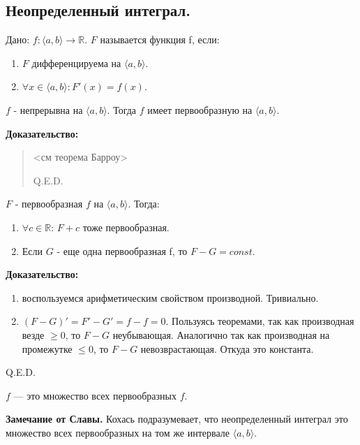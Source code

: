 \subsection{Неопределенный интеграл.}

 Дано: $f: \langle a,b\rangle \rightarrow \mathbb{R}$. $F$ называется  функция f, если:

\begin{enumerate}
    \item $F$ дифференцируема на $\langle a,b\rangle$.

    \item $\forall x \in \langle a,b\rangle: F'(x) = f(x) $.
\end{enumerate}


$f$ - непрерывна на $\langle a,b \rangle$. Тогда $f$ имеет первообразную на $\langle a,b\rangle$.

\textbf{Доказательство:}
\begin{quote}
    <см теорема Барроу>
    
    \hfill Q.E.D.
\end{quote}


$F$ - первообразная $f$ на $\langle a,b \rangle$. Тогда:
\begin{enumerate}
    \item $\forall c \in \mathbb{R}$: $F + c$ тоже первообразная.
    \item Если $G$ - еще одна первообразная f, то $F - G = const$.
\end{enumerate}
\textbf{Доказательство:}

    \begin{enumerate}
        \item воспользуемся арифметическим свойством производной. Тривиально.
        \item $(F-G)' = F' -G' =f-f= 0$. Пользуясь теоремами, так как производная везде $\geq 0$, то $F-G$ неубывающая. Аналогично так как производная на промежутке $\leq 0 $, то $F-G$ невозврастающая. Откуда это константа.
    \end{enumerate}
    \hfill Q.E.D.

 $f$ --- это множество всех первообразных $f$.

\textbf{Замечание от Славы.} Кохась подразумевает, что неопределенный интеграл это множество всех первообразных на том же интервале $\langle a,b \rangle$.


